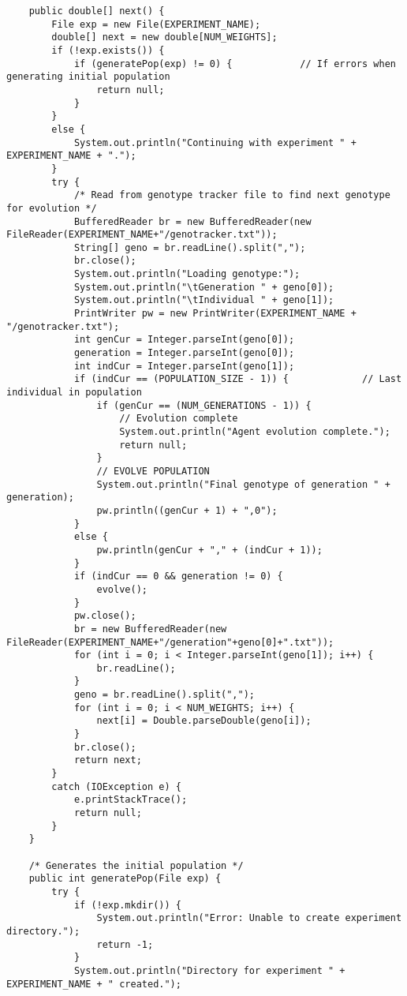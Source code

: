 \documentclass[12pt,a4paper]{article}
\begin{document}
\begin{lstlisting}
    public double[] next() {
        File exp = new File(EXPERIMENT_NAME);
        double[] next = new double[NUM_WEIGHTS];
        if (!exp.exists()) {
            if (generatePop(exp) != 0) {            // If errors when generating initial population
                return null;
            }
        }
        else {
            System.out.println("Continuing with experiment " + EXPERIMENT_NAME + ".");
        }
        try {
            /* Read from genotype tracker file to find next genotype for evolution */
            BufferedReader br = new BufferedReader(new FileReader(EXPERIMENT_NAME+"/genotracker.txt"));
            String[] geno = br.readLine().split(",");
            br.close();
            System.out.println("Loading genotype:");
            System.out.println("\tGeneration " + geno[0]);
            System.out.println("\tIndividual " + geno[1]);
            PrintWriter pw = new PrintWriter(EXPERIMENT_NAME + "/genotracker.txt");
            int genCur = Integer.parseInt(geno[0]);
            generation = Integer.parseInt(geno[0]);
            int indCur = Integer.parseInt(geno[1]);
            if (indCur == (POPULATION_SIZE - 1)) {             // Last individual in population
                if (genCur == (NUM_GENERATIONS - 1)) {
                    // Evolution complete
                    System.out.println("Agent evolution complete.");
                    return null;
                }
                // EVOLVE POPULATION
                System.out.println("Final genotype of generation " + generation);
                pw.println((genCur + 1) + ",0");
            }
            else {
                pw.println(genCur + "," + (indCur + 1));
            }
            if (indCur == 0 && generation != 0) {
                evolve();
            }
            pw.close();
            br = new BufferedReader(new FileReader(EXPERIMENT_NAME+"/generation"+geno[0]+".txt"));
            for (int i = 0; i < Integer.parseInt(geno[1]); i++) {
                br.readLine();
            }
            geno = br.readLine().split(",");
            for (int i = 0; i < NUM_WEIGHTS; i++) {
                next[i] = Double.parseDouble(geno[i]);
            }
            br.close();
            return next;
        }
        catch (IOException e) {
            e.printStackTrace();
            return null;
        }
    }

    /* Generates the initial population */
    public int generatePop(File exp) {
        try {
            if (!exp.mkdir()) {
                System.out.println("Error: Unable to create experiment directory.");
                return -1;
            }
            System.out.println("Directory for experiment " + EXPERIMENT_NAME + " created.");


\end{lstlisting}
\end{document}
